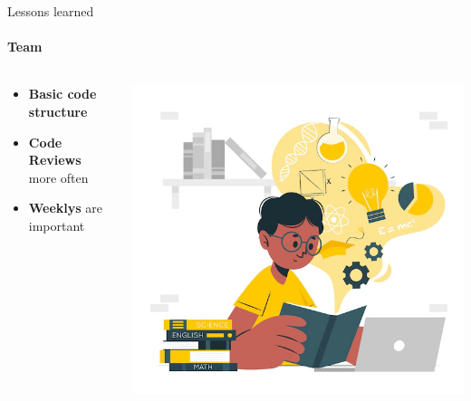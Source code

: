 \documentclass[
    ngerman,%
    authorontitle=true,
]{bfhbeamer}
\begin{document}
    \begin{frame}{Lessons learned}
        \framesubtitle{Team}
        \begin{columns} %
            \begin{column}{0.5\textwidth} %
                \begin{itemize}
                    \item \textbf{Basic code structure}
                    \item \textbf{Code Reviews} more often 
                    \item \textbf{Weeklys} are important
                \end{itemize}
            \end{column}
            \begin{column}{0.3\textwidth} %
                \begin{center}
                    \includegraphics[width=1\textwidth]{pictures/Learnings}
                \end{center}
            \end{column}
        \end{columns}
    \end{frame}
\end{document}
